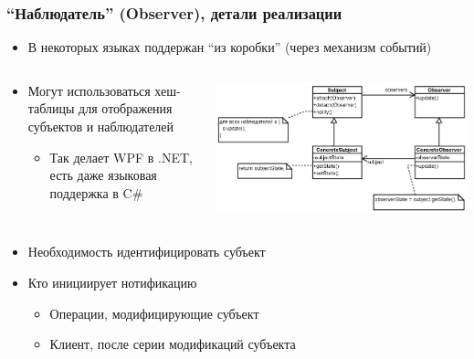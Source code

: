 \documentclass[xetex,mathserif,serif]{beamer}
\begin{document}
    \begin{frame}
        \frametitle{``Наблюдатель'' (Observer), детали реализации}
        \begin{itemize}
            \item В некоторых языках поддержан ``из коробки'' (через механизм событий)
        \end{itemize}
        \begin{columns}
            \begin{column}{0.45\textwidth}
                \begin{itemize}
                    \item Могут использоваться хеш-таблицы для отображения субъектов и наблюдателей
                    \begin{itemize}
                        \item Так делает WPF в .NET, есть даже языковая поддержка в C\#
                    \end{itemize}
                \end{itemize}
            \end{column}
            \begin{column}{0.55\textwidth}
                \begin{center}
                    \includegraphics[width=\textwidth]{observer.png}
                \end{center}
            \end{column}
        \end{columns}
        \begin{itemize}
            \item Необходимость идентифицировать субъект
            \item Кто инициирует нотификацию
            \begin{itemize}
                \item Операции, модифицирующие субъект
                \item Клиент, после серии модификаций субъекта
            \end{itemize}
        \end{itemize}
    \end{frame}
\end{document}
